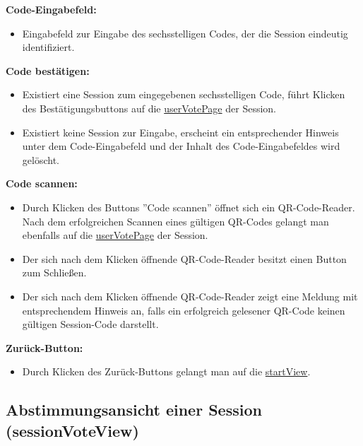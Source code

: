 \documentclass[oneside, ngerman]{sdqtechreport}
\begin{document}
\textbf{Code-Eingabefeld:}
\begin{itemize}
    \item Eingabefeld zur Eingabe des sechsstelligen Codes, der die Session eindeutig identifiziert.
\end{itemize}

\textbf{Code bestätigen:}
\begin{itemize}
    \item Existiert eine Session zum eingegebenen sechsstelligen Code, führt Klicken des Bestätigungsbuttons auf die \hyperlink{userVotePage}{userVotePage} der Session.
    \item Existiert keine Session zur Eingabe, erscheint ein entsprechender Hinweis unter dem Code-Eingabefeld und der Inhalt des Code-Eingabefeldes wird gelöscht.
\end{itemize}

\textbf{Code scannen:}
\begin{itemize}
    \item Durch Klicken des Buttons ''Code scannen'' öffnet sich ein QR-Code-Reader. Nach dem erfolgreichen Scannen eines gültigen QR-Codes gelangt man ebenfalls auf die \hyperlink{userVotePage}{userVotePage} der Session.
    \item Der sich nach dem Klicken öffnende QR-Code-Reader besitzt einen Button zum Schließen.
    \item Der sich nach dem Klicken öffnende QR-Code-Reader zeigt eine Meldung mit entsprechendem Hinweis an, falls ein erfolgreich gelesener QR-Code keinen gültigen Session-Code darstellt.
\end{itemize}

\textbf{Zurück-Button:}
\begin{itemize}
    \item Durch Klicken des Zurück-Buttons gelangt man auf die \hyperlink{startView}{startView}.
\end{itemize}

\newpage

\subsection{Abstimmungsansicht einer Session (sessionVoteView)}
\label{sec:Benutzeroberfläche:joinSessionView}
\end{document}
